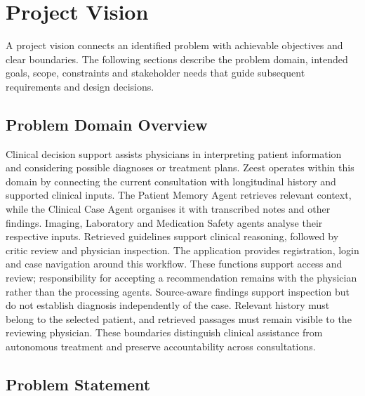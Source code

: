\begingroup
\renewcommand{\encodingdefault}{T1}
\selectfont
\chapter{Project Vision}

A project vision connects an identified problem with achievable objectives and clear boundaries. The following sections describe the problem domain, intended goals, scope, constraints and stakeholder needs that guide subsequent requirements and design decisions.

\section{Problem Domain Overview}

Clinical decision support assists physicians in interpreting patient information and considering possible diagnoses or treatment plans. Zeest operates within this domain by connecting the current consultation with longitudinal history and supported clinical inputs. The Patient Memory Agent retrieves relevant context, while the Clinical Case Agent organises it with transcribed notes and other findings. Imaging, Laboratory and Medication Safety agents analyse their respective inputs. Retrieved guidelines support clinical reasoning, followed by critic review and physician inspection. The application provides registration, login and case navigation around this workflow. These functions support access and review; responsibility for accepting a recommendation remains with the physician rather than the processing agents. Source-aware findings support inspection but do not establish diagnosis independently of the case. Relevant history must belong to the selected patient, and retrieved passages must remain visible to the reviewing physician. These boundaries distinguish clinical assistance from autonomous treatment and preserve accountability across consultations.

\section{Problem Statement}

